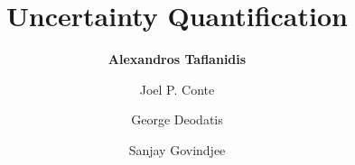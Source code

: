 %
%
%


%
%
%
%
%
%
%
%

\title{Uncertainty Quantification}
\author{
    \textbf{Alexandros Taflanidis}
    \and Joel P. Conte
    \and George Deodatis
    \and Sanjay Govindjee}
\tocauthor{}
%
%
\maketitle

